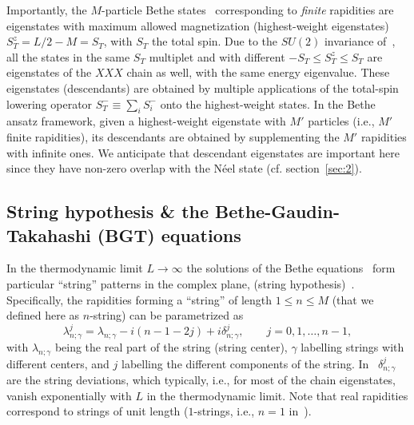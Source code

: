 \documentclass[11pt]{iopart}
\begin{document}
Importantly, the $M$-particle Bethe states~ corresponding to 
{\it finite} rapidities are eigenstates with maximum allowed magnetization 
(highest-weight eigenstates) $S_T^z=L/2-M=S_T$, with $S_T$ the total spin. 
Due to the $SU(2)$ invariance of~, all the states in the same 
$S_T$ multiplet and with different $-S_T\le S_T^z\le S_T$ are eigenstates of the 
$XXX$ chain as well, with the same energy eigenvalue. These eigenstates 
(descendants) are obtained by multiple applications of the total-spin lowering 
operator $S_T^-\equiv\sum_iS_i^-$ onto the highest-weight states. In the Bethe 
ansatz framework, given a highest-weight eigenstate with $M'$ particles (i.e., 
$M'$ finite rapidities), its descendants are obtained by supplementing the $M'$ 
rapidities with infinite ones. We anticipate that descendant eigenstates 
are important here since they have non-zero overlap with the N\'eel state (cf. 
section~\ref{sec:2}). 
 
\subsection{String hypothesis \& the Bethe-Gaudin-Takahashi (BGT) equations}
\label{sec:1.3}

In the thermodynamic limit $L\to\infty$ the solutions of the Bethe equations~ 
form particular ``string'' patterns in the complex plane, (string hypothesis)~\cite{
bethe-1931,taka-book}. Specifically, the rapidities forming a ``string'' of length $1
\le n\le M$ (that we defined here as $n$-string) can be parametrized as 
%
\begin{equation}
\label{str-hyp}
\lambda^{j}_{n;\gamma}=\lambda_{n;\gamma}-i(n-1-2j)+i\delta_{n;\gamma}^j,\qquad 
j=0,1,\dots, n-1, 
\end{equation}
%
with $\lambda_{n;\gamma}$ being the real part of the string (string center), 
$\gamma$ labelling strings with different centers, and $j$ labelling the different 
components of the string. In~ $\delta_{n;\gamma}^j$ are the string 
deviations, which typically, i.e., for most of the chain eigenstates, vanish 
exponentially with $L$ in the thermodynamic limit. Note that real rapidities 
correspond to strings of unit length ($1$-strings, i.e., $n=1$ in~). 
\end{document}
